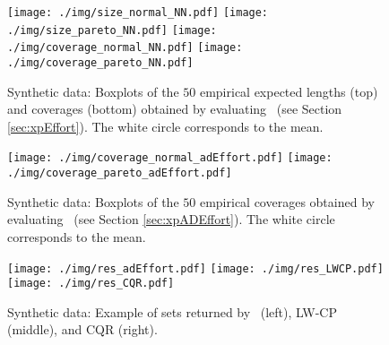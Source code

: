 \begin{figure*}[h!]
	\centering
	\texttt{[image: ./img/size\_normal\_NN.pdf]}
	\texttt{[image: ./img/size\_pareto\_NN.pdf]}
	\texttt{[image: ./img/coverage\_normal\_NN.pdf]}
	\texttt{[image: ./img/coverage\_pareto\_NN.pdf]}
	\caption{Synthetic data: %
	Boxplots of the $50$ empirical expected lengths (top) and coverages (bottom) obtained by evaluating \method~(see Section \ref{sec:xpEffort}). The white circle corresponds to the mean.} 
	\label{fig:illustr_synth_NN}
\end{figure*}

\begin{figure*}[h!]
	\centering
	\texttt{[image: ./img/coverage\_normal\_adEffort.pdf]}
	\texttt{[image: ./img/coverage\_pareto\_adEffort.pdf]}
	\caption{Synthetic data: Boxplots of the $50$ empirical coverages obtained by evaluating \methodAD~(see Section \ref{sec:xpADEffort}). The white circle corresponds to the mean.} 
	\label{fig:illustr_synth_adEffort_coverage}
\end{figure*}

\begin{figure*}[h!]
	\centering
	\texttt{[image: ./img/res\_adEffort.pdf]}
	\texttt{[image: ./img/res\_LWCP.pdf]}
	\texttt{[image: ./img/res\_CQR.pdf]}
	\caption{Synthetic data: Example of sets returned by \methodAD~(left), LW-CP (middle), and CQR (right).} 
	\label{fig:illustr_synth_adEffort_example}
\end{figure*}


